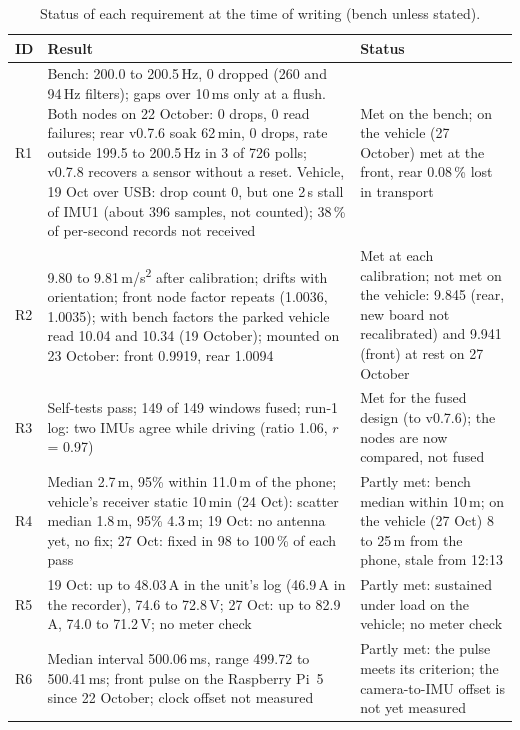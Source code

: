 \begin{table}[htbp]
\centering
\small
\caption[Status of each requirement at the time of writing (bench unless stated)]{Status of each requirement at the time of writing (bench unless stated).}
\label{tab:results-summary}
\begin{tabular}{|p{0.8cm}|p{7.6cm}|p{5.4cm}|}
\hline
\textbf{ID} & \textbf{Result} & \textbf{Status} \\ \hline
R1 & Bench: 200.0 to 200.5\,Hz, 0 dropped (260 and 94\,Hz filters); gaps over 10\,ms only at a flush. Both nodes on 22 October: 0 drops, 0 read failures; rear v0.7.6 soak 62\,min, 0 drops, rate outside 199.5 to 200.5\,Hz in 3 of 726 polls; v0.7.8 recovers a sensor without a reset. Vehicle, 19 Oct over USB: drop count 0, but one 2\,s stall of IMU1 (about 396 samples, not counted); 38\,\% of per-second records not received & Met on the bench; on the vehicle (27 October) met at the front, rear 0.08\,\% lost in transport \\ \hline
R2 & 9.80 to 9.81\,m/s\textsuperscript{2} after calibration; drifts with orientation; front node factor repeats (1.0036, 1.0035); with bench factors the parked vehicle read 10.04 and 10.34 (19 October); mounted on 23 October: front 0.9919, rear 1.0094 & Met at each calibration; not met on the vehicle: 9.845 (rear, new board not recalibrated) and 9.941 (front) at rest on 27 October \\ \hline
R3 & Self-tests pass; 149 of 149 windows fused; run-1 log: two IMUs agree while driving (ratio 1.06, $r$ = 0.97) & Met for the fused design (to v0.7.6); the nodes are now compared, not fused \\ \hline
R4 & Median 2.7\,m, 95\% within 11.0\,m of the phone; vehicle's receiver static 10\,min (24 Oct): scatter median 1.8\,m, 95\% 4.3\,m; 19 Oct: no antenna yet, no fix; 27 Oct: fixed in 98 to 100\,\% of each pass & Partly met: bench median within 10\,m; on the vehicle (27 Oct) 8 to 25\,m from the phone, stale from 12:13 \\ \hline
R5 & 19 Oct: up to 48.03\,A in the unit's log (46.9\,A in the recorder), 74.6 to 72.8\,V; 27 Oct: up to 82.9\,A, 74.0 to 71.2\,V; no meter check & Partly met: sustained under load on the vehicle; no meter check \\ \hline
R6 & Median interval 500.06\,ms, range 499.72 to 500.41\,ms; front pulse on the Raspberry Pi~5 since 22 October; clock offset not measured & Partly met: the pulse meets its criterion; the camera-to-IMU offset is not yet measured \\ \hline

\end{tabular}
\end{table}
